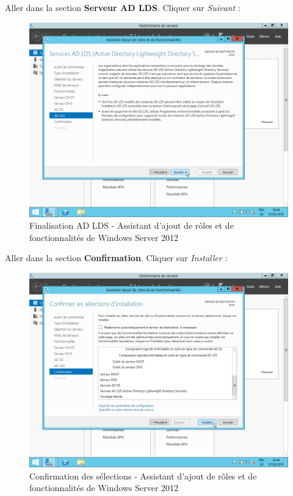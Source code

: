 \newpage
Aller dans la section \textbf{Serveur AD LDS}. Cliquer sur \textit{Suivant} :
\begin{figure}[h!]
    \begin{center}
        \includegraphics[scale=0.6]{WS2012_Screenshots/30.png}
        \caption{Finalisation AD LDS - Assistant d'ajout de rôles et de fonctionnalités de Windows Server 2012}
        \label{WS2012_Screenshots/30}
    \end{center}
\end{figure}
\FloatBarrier

\newpage
Aller dans la section \textbf{Confirmation}. Cliquer sur \textit{Installer} :
\begin{figure}[h!]
    \begin{center}
        \includegraphics[scale=0.6]{WS2012_Screenshots/31.png}
        \caption{Confirmation des sélections - Assistant d'ajout de rôles et de fonctionnalités de Windows Server 2012}
        \label{WS2012_Screenshots/31}
    \end{center}
\end{figure}
\FloatBarrier

